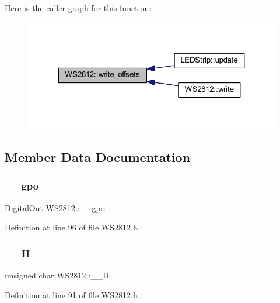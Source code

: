 Here is the caller graph for this function\+:\nopagebreak
\begin{figure}[H]
\begin{center}
\leavevmode
\includegraphics[width=321pt]{class_w_s2812_a578fd0b278445bd6f84e260a69b18a68_icgraph}
\end{center}
\end{figure}


\subsection{Member Data Documentation}
\mbox{\label{class_w_s2812_a37c5f3871012186c92a1bf856ca888ee}} 
\subsubsection{\texorpdfstring{\+\_\+\+\_\+gpo}{\_\_gpo}}
{\footnotesize\ttfamily Digital\+Out W\+S2812\+::\+\_\+\+\_\+gpo\hspace{0.3cm}{\ttfamily [private]}}



Definition at line 96 of file W\+S2812.\+h.

\mbox{\label{class_w_s2812_a90cb6ef1c50bfa6b2d1a7e6100adead7}} 
\subsubsection{\texorpdfstring{\+\_\+\+\_\+\+II}{\_\_II}}
{\footnotesize\ttfamily unsigned char W\+S2812\+::\+\_\+\+\_\+\+II\hspace{0.3cm}{\ttfamily [private]}}



Definition at line 91 of file W\+S2812.\+h.

